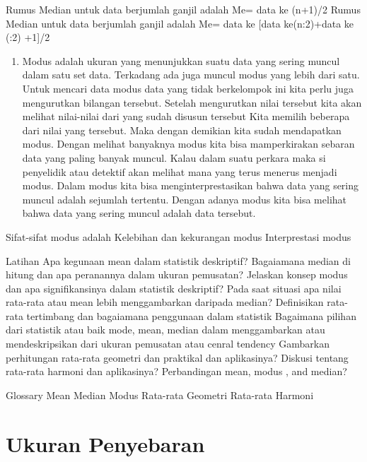 \documentclass[
]{book}
\providecommand{\tightlist}{%
  \setlength{\itemsep}{0pt}\setlength{\parskip}{0pt}}
\theoremstyle{definition}
\theoremstyle{definition}
\theoremstyle{definition}
\theoremstyle{definition}
\theoremstyle{remark}
\begin{document}
Rumus Median untuk data berjumlah ganjil adalah Me= data ke (n+1)/2
Rumus Median untuk data berjumlah ganjil adalah Me= data ke {[}data ke(n:2)+data ke (:2) +1{]}/2

\begin{enumerate}
\def\labelenumi{\arabic{enumi}.}
\setcounter{enumi}{4}
\tightlist
\item
  Modus adalah ukuran yang menunjukkan suatu data yang sering muncul dalam satu set data. Terkadang ada juga muncul modus yang lebih dari satu. Untuk mencari data modus data yang tidak berkelompok ini kita perlu juga mengurutkan bilangan tersebut. Setelah mengurutkan nilai tersebut kita akan melihat nilai-nilai dari yang sudah disusun tersebut Kita memilih beberapa dari nilai yang tersebut. Maka dengan demikian kita sudah mendapatkan modus. Dengan melihat banyaknya modus kita bisa mamperkirakan sebaran data yang paling banyak muncul. Kalau dalam suatu perkara maka si penyelidik atau detektif akan melihat mana yang terus menerus menjadi modus.
  Dalam modus kita bisa menginterprestasikan bahwa data yang sering muncul adalah sejumlah tertentu. Dengan adanya modus kita bisa melihat bahwa data yang sering muncul adalah data tersebut.
\end{enumerate}

Sifat-sifat modus adalah
Kelebihan dan kekurangan modus
Interprestasi modus

Latihan
Apa kegunaan mean dalam statistik deskriptif?
Bagaiamana median di hitung dan apa peranannya dalam ukuran pemusatan?
Jelaskan konsep modus dan apa signifikansinya dalam statistik deskriptif?
Pada saat situasi apa nilai rata-rata atau mean lebih menggambarkan daripada median?
Definisikan rata-rata tertimbang dan bagaiamana penggunaan dalam statistik
Bagaimana pilihan dari statistik atau baik mode, mean, median dalam menggambarkan atau mendeskripsikan dari ukuran pemusatan atau cenral tendency
Gambarkan perhitungan rata-rata geometri dan praktikal dan aplikasinya?
Diskusi tentang rata-rata harmoni dan aplikasinya?
Perbandingan mean, modus , and median?

Glossary
Mean
Median
Modus
Rata-rata Geometri
Rata-rata Harmoni

\hypertarget{ukuran-penyebaran}{%
\chapter{Ukuran Penyebaran}\label{ukuran-penyebaran}}
\end{document}
